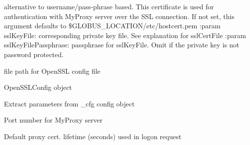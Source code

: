 \documentclass[letterpaper,10pt,english]{sphinxmanual}
\begin{document}
\begin{fulllineitems}
\begin{fulllineitems}
alternative to username/pass-phrase based.  This certificate is used for 
authentication with MyProxy server over the SSL connection.  If not set,
this argument defaults to \$GLOBUS\_LOCATION/etc/hostcert.pem 
:param sslKeyFile: corresponding private key file.  See explanation
for sslCertFile
:param sslKeyFilePassphrase: passphrase for sslKeyFile.  Omit if the
private key is not password protected.

\end{fulllineitems}


\begin{fulllineitems}
\label{client:myproxy.client.MyProxyClient.openSSLConfFilePath}
file path for OpenSSL config file

\end{fulllineitems}


\begin{fulllineitems}
\label{client:myproxy.client.MyProxyClient.openSSLConfig}
OpenSSLConfig object

\end{fulllineitems}


\begin{fulllineitems}
\label{client:myproxy.client.MyProxyClient.parseConfig}
Extract parameters from \_cfg config object

\end{fulllineitems}


\begin{fulllineitems}
\label{client:myproxy.client.MyProxyClient.port}
Port number for MyProxy server

\end{fulllineitems}


\begin{fulllineitems}
\label{client:myproxy.client.MyProxyClient.proxyCertLifetime}
Default proxy cert. lifetime (seconds) used in logon request


\end{fulllineitems}
\end{fulllineitems}
\end{document}
